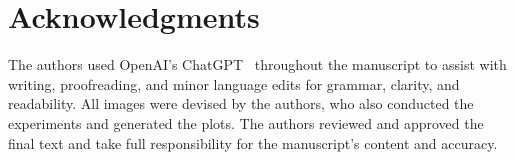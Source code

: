 \documentclass[letterpaper, 10 pt, conference]{ieeeconf}
\theoremstyle{plain}
\begin{document}
\section*{Acknowledgments}
The authors used OpenAI's ChatGPT~\cite{openai_chatgpt}
throughout the manuscript to assist with writing, proofreading,
and minor language edits for grammar, clarity, and readability.
All images were devised by the authors, who also conducted
the experiments and generated the plots. The authors reviewed
and approved the final text and take full responsibility for
the manuscript's content and accuracy.



\end{document}
